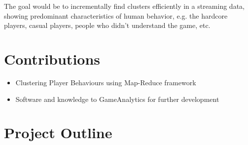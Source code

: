 The goal would be to incrementally find clusters efficiently in a streaming data, showing predominant characteristics of human behavior, e.g. the hardcore players, casual players, people who didn't understand the game, etc.

\section{Contributions}
\begin{itemize}
\item Clustering Player Behaviours using Map-Reduce framework
\item Software and knowledge to GameAnalytics for further development
\end{itemize}

\section{Project Outline}

